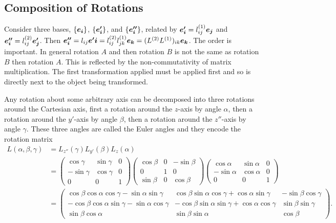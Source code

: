 \documentclass[a4paper]{article}
\begin{document}
    \subsection{Composition of Rotations}
    Consider three bases, \(\{\bm{e_{i}}\}\), \(\{\bm{e'_i}\}\), and \(\{\bm{e''_i}\}\), related by \(\bm{e'_i} = l^{(1)}_{ij}\bm{e_{j}}\) and \(\bm{e''_i} = l^{(2)}_{ij}\bm{e'_j}\).
    Then \(\bm{e''_i} = l_{ij}\bm{e'i} = l^{(2)}_{ij}l^{(1)}_{jk}\bm{e_{k}} = (L^{(2)}L^{(1)})_{ik}\bm{e_{k}}\).
    The order is important.
    In general rotation \(A\) and then rotation \(B\) is not the same as rotation \(B\) then rotation \(A\).
    This is reflected by the non-commutativity of matrix multiplication.
    The first transformation applied must be applied first and so is directly next to the object being transformed.
    
    Any rotation about some arbitrary axis can be decomposed into three rotations around the Cartesian axis, first a rotation around the \(z\)-axis by angle \(\alpha\), then a rotation around the \(y'\)-axis by angle \(\beta\), then a rotation around the \(z''\)-axis by angle \(\gamma\).
    These three angles are called the Euler angles and they encode the rotation matrix
    \begin{align*}
        L(\alpha, \beta, \gamma) &= L_{z''}(\gamma)L_{y'}(\beta)L_{z}(\alpha)\\
        &=
        \begin{pmatrix}
            \cos\gamma & \sin\gamma & 0\\
            -\sin\gamma & \cos\gamma & 0\\
            0 & 0 & 1
        \end{pmatrix}
        \begin{pmatrix}
            \cos\beta & 0 & -\sin\beta\\
            0 & 1 & 0\\
            \sin\beta & 0 & \cos\beta
        \end{pmatrix}
        \begin{pmatrix}
            \cos\alpha & \sin\alpha & 0\\
            -\sin\alpha & \cos\alpha & 0\\
            0 & 0 & 1
        \end{pmatrix}
        \\
        &=
        \begin{pmatrix}
            \cos\beta\cos\alpha\cos\gamma - \sin\alpha\sin\gamma & \cos\beta\sin\alpha\cos\gamma + \cos\alpha\sin\gamma & -\sin\beta\cos\gamma\\
            -\cos\beta\cos\alpha\sin\gamma - \sin\alpha\cos\gamma & -\cos\beta\sin\alpha\sin\gamma + \cos\alpha\cos\gamma & \sin\beta\sin\gamma\\
            \sin\beta\cos\alpha & \sin\beta\sin\alpha & \cos\beta
        \end{pmatrix}
        .
    \end{align*}
\end{document}
